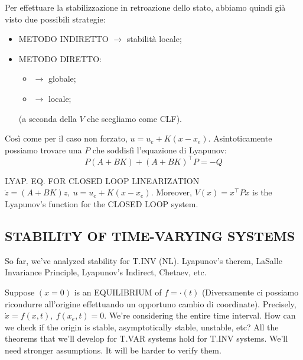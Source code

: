 Per effettuare la stabilizzazione in retroazione dello stato, abbiamo quindi già visto due possibili strategie:
\begin{itemize}
\item METODO INDIRETTO $\rightarrow$ stabilità locale;
\item METODO DIRETTO:
\begin{itemize}
\item{$\rightarrow$} globale;
\item{$\rightarrow$} locale;
\end{itemize}
(a seconda della $V$ che scegliamo come CLF).
\end{itemize}

Così come per il caso non forzato, $u=u_e + K(x-x_e)$. Asintoticamente possiamo trovare una $P$ che soddisfi l'equazione di Lyapunov:
\[
	P(A+BK)+(A+BK)^\top P = -Q
\]

LYAP. EQ. FOR CLOSED LOOP LINEARIZATION $\dot{z}=(A+BK)z,\ u=u_e+K(x-x_e)$. Moreover, $V(x)=x^\top Px$ is the Lyapunov's function for the CLOSED LOOP system.

\subsection{STABILITY OF TIME-VARYING SYSTEMS}

So far, we've analyzed stability for T.INV (NL). Lyapunov's therem, LaSalle Invariance Principle, Lyapunov's Indirect, Chetaev, etc.

Suppose $(x=0)$ is an EQUILIBRIUM of $f=\mathord{\cdot}(t)$ (Diversamente ci possiamo ricondurre all'origine effettuando un opportuno cambio di coordinate). Precisely, $\dot{x}=f(x,t),\ f(x_e,t)=0$. We're considering the entire time interval. How can we check if the origin is stable, asymptotically stable, unstable, etc? All the theorems that we'll develop for T.VAR systems hold for T.INV systems. We'll need stronger assumptions. It will be harder to verify them.

